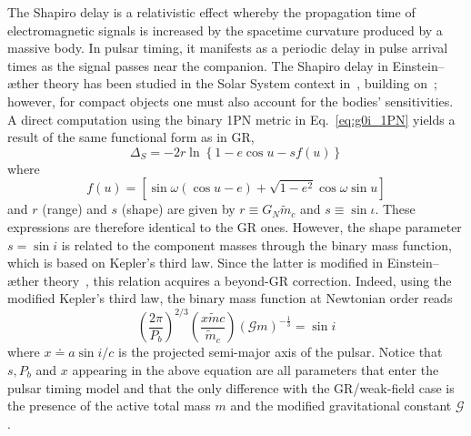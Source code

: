 \documentclass[
    floats,
    floatfix,
    amssymb,
    prd,
    twocolumn,
    superscriptaddress,
    nofootinbib,
    unicode,
    colorlinks=true,
    linktocpage=true
]{revtex4-2}
\begin{document}
The Shapiro delay is a relativistic effect whereby the propagation time of 
electromagnetic signals is increased by the spacetime curvature produced by a 
massive body. In pulsar timing, it manifests as a periodic delay in pulse arrival 
times as the signal passes near the companion. The Shapiro delay in Einstein--\ae ther 
theory has been studied in the Solar System context in~\cite{Shapiro_Solar_2020}, 
building on~\cite{BH_in_EA_charged}; however, for compact objects one must also 
account for the bodies' sensitivities. A direct computation using the binary 1PN 
metric in Eq.~\eqref{eq:g0i_1PN} yields a result of the same functional form as in GR,
\begin{equation}
    \Delta_S = -2r \ln \left\{ 1 - e \cos u - s f(u) \right\}
\end{equation}
where 
\begin{equation}
f(u)=\left[ \sin \omega (\cos u - e) + \sqrt{1 - e^2} \cos \omega \sin u \right]
\end{equation}
and $r$ (range) and $s$ (shape) are given by $r\equiv G_N \tilde{m}_c$ and $s\equiv\sin{\iota}$. These expressions are therefore identical to the GR ones. However, the shape 
parameter $s = \sin i$ is related to the component masses through the binary mass 
function, which is based on Kepler's third law. Since the latter is modified in 
Einstein--\ae ther theory~\cite{Yagi_2014}, this relation acquires a beyond-GR 
correction. Indeed, using the modified Kepler's third law, the binary mass function 
at Newtonian order reads
\begin{equation}\label{eq:s}
 \left( \frac{2 \pi}{P_b}   \right)^{2/3}  \left( \frac{x \tilde{m} c}{\tilde{m}_c} \right) (\mathcal{G} m)^{-\frac{1}{3}} = \sin{i} 
\end{equation}
where $x\doteq a \sin{i} /c$ is the projected semi-major axis of the pulsar. Notice that $s,P_b$ and $x$ appearing in the above equation are all parameters that enter the pulsar timing model and that the only difference with the GR/weak-field case is the presence of the active total mass $m$ and the modified gravitational constant $\mathcal{G}$. 
\end{document}
